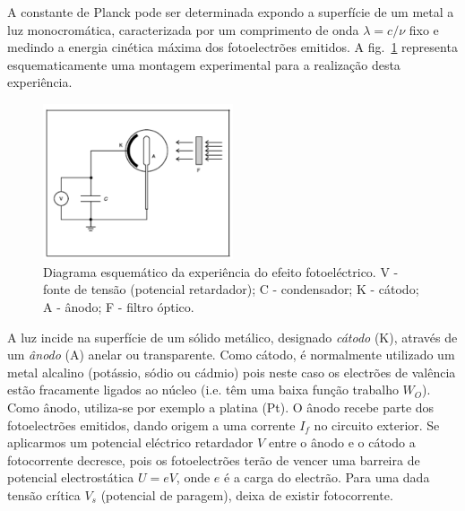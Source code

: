 \documentclass[a4paper,12pt]{article}  %
\begin{document}

A constante de Planck pode ser determinada expondo a superfície de um metal a luz monocromática, caracterizada por um comprimento de onda $\lambda=c /\nu$ fixo e medindo a energia cinética máxima dos fotoelectrões emitidos. A fig.~\ref{fig:plack_exp} representa esquematicamente uma montagem experimental para a realização desta experiência.

\begin{figure}[htb] 
	\centering 
	\includegraphics[width=0.5\textwidth]{planck_exp} 
	\caption{Diagrama esquemático da experiência do efeito fotoeléctrico. V - fonte de tensão (potencial retardador); C - condensador; K - cátodo; A - ânodo; F - filtro óptico.} \label{fig:plack_exp}
\end{figure}


A luz incide na superfície de um sólido metálico, designado \emph{cátodo} (K), através de um \emph{ânodo} (A) anelar ou transparente. 
Como cátodo, é normalmente utilizado um metal alcalino (potássio, sódio ou cádmio)  pois neste caso os electrões de valência estão fracamente 
ligados ao núcleo (i.e. têm uma baixa função trabalho $W_O$). Como ânodo, utiliza-se por exemplo a platina (Pt). 
O ânodo recebe parte dos fotoelectrões emitidos, dando origem a uma corrente $I_f$ no circuito exterior. 
Se aplicarmos um potencial eléctrico retardador $V$ entre o ânodo e o cátodo a fotocorrente decresce, pois os fotoelectrões terão de vencer uma barreira de potencial electrostática $U=e V$, onde $e$ é a carga do electrão. 
Para uma dada tensão crítica $V_s$ (potencial de paragem), deixa de existir fotocorrente. 
\end{document}
